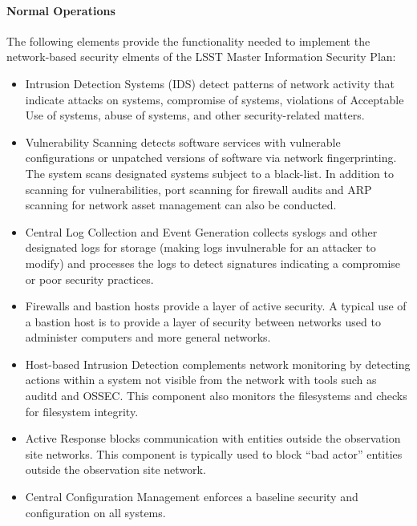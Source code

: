 \paragraph{Normal Operations}

The following elements provide the functionality needed to implement the 
network-based security elments of the LSST Master Information Security Plan:

\begin{itemize}

\item Intrusion Detection Systems (IDS) detect patterns of network activity that 
indicate attacks on systems, compromise of systems, violations of Acceptable Use 
of systems, abuse of systems, and other security-related matters. 

\item Vulnerability Scanning detects software services with vulnerable 
configurations or unpatched versions of software via network fingerprinting. The 
system scans designated systems subject to a black-list. In addition to scanning 
for vulnerabilities, port scanning for firewall audits and ARP scanning for 
network asset management can also be conducted.

\item Central Log Collection and Event Generation collects syslogs and other 
designated logs for storage (making logs invulnerable for an attacker to modify) 
and processes the logs to detect signatures indicating a compromise or poor 
security practices.

\item Firewalls and bastion hosts provide a layer of active security. A typical 
use of a bastion host is to provide a layer of security between networks used to 
administer computers and more general networks.

\item Host-based Intrusion Detection complements network monitoring by detecting 
actions within a system not visible from the network with tools such as auditd 
and OSSEC. This component also monitors the filesystems and checks for filesystem 
integrity.

\item Active Response blocks communication with entities outside the observation site 
networks. This component is typically used to block “bad actor” entities outside 
the observation site network.

\item Central Configuration Management enforces a baseline security and configuration 
on all systems.

\end{itemize}

